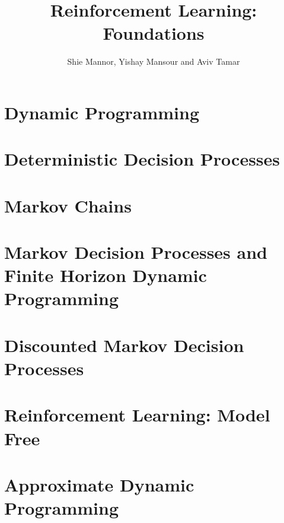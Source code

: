 \documentclass[12pt]{book}
\title{Reinforcement Learning: Foundations}
\date{February 2023
\\
  \textcolor{red}{This book is still work in progress. In particular, references to literature are not complete. We would be grateful for comments, suggestions, omissions, and errors of any kind, at \url{rlfoundationsbook@gmail.com}. }

}
\author{Shie Mannor, Yishay Mansour and Aviv Tamar}
\begin{document}
\maketitle

\tableofcontents

\chapter{Dynamic Programming}
\label{chapter:dp}


\chapter{Deterministic Decision Processes}
\label{chapter:DDP}


\chapter{Markov Chains}
\label{chapter:MC}


\chapter{Markov Decision Processes and Finite Horizon Dynamic Programming}
\label{chapter:MDP-FH}


\chapter{Discounted Markov Decision Processes}
\label{chapter:disc}


% 

\chapter{Reinforcement Learning: Model Free}
\label{chapter:learning-model-free}

% 
% 

\chapter{Approximate Dynamic Programming}
\label{chapter:approx-dp}

\end{document}
